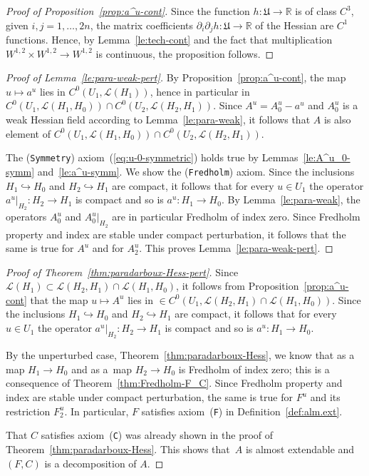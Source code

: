 \documentclass[pdftex]{sigma}
\numberwithin{equation}{section}
\newcommand{\R}{{\mathbb{R}}}
\newcommand{\Ll}{{\mathcal{L}}} %
\newcommand{\p}{{\partial}}
\newcommand{\INTO}{\hookrightarrow} %
\newcommand{\1}{{{\mathchoice {\rm 1\mskip-4mu l} {\rm 1\mskip-4mu l}
{\rm 1\mskip-4.5mu l} {\rm 1\mskip-5mu l}}}}
\begin{document}
\begin{proof}[Proof of Proposition~\ref{prop:a^u-cont}]
Since the function $h\colon\mathfrak{U}\to\R$ is of class $C^3$,
given $i,j=1,\dots,2n$, the matrix coefficients
$\p_i\p_j h\colon \mathfrak{U}\to\R$ of the Hessian are $C^1$ functions.
Hence, by Lemma~\ref{le:tech-cont}
and the fact that multiplication $W^{1,2}\times W^{1,2}\to W^{1,2}$ is
continuous, the proposition follows.
\end{proof}

\begin{proof}[Proof of Lemma~\ref{le:para-weak-pert}]
By Proposition~\ref{prop:a^u-cont},
the map $u\mapsto a^u$ lies in $C^0(U_1,\Ll(H_1))$,
hence in particular in
$C^0(U_1,\Ll(H_1,H_0)) \cap C^0(U_2,\Ll(H_2,H_1))$.
Since $A^u=A^u_0-a^u$ and $A^u_0$ is a weak Hessian field according to
Lemma~\ref{le:para-weak}, it follows that
$A$ is also element of $C^0(U_1,\Ll(H_1,H_0)) \cap C^0(U_2,\Ll(H_2,H_1))$.

The (\texttt{Symmetry}) axiom~(\ref{eq:u-0-symmetric}) holds true by
Lemmas~\ref{le:A^u_0-symm} and~\ref{le:a^u-symm}.
We show the (\texttt{Fredholm}) axiom.
Since the inclusions $H_1\INTO H_0$ and $H_2\INTO H_1$
are compact, it follows that for every $u\in U_1$
the operator $a^u|_{H_2}\colon H_2\to H_1$ is compact
and so is $a^u\colon H_1\to H_0$.
By Lemma~\ref{le:para-weak}, the operators $A^u_0$ and $A^u_0|_{H_2}$
are in particular Fredholm of index zero.
Since Fredholm property and index are stable under compact perturbation,
it follows that the same is true for $A^u$ and for $A^u_2$.
This proves Lemma~\ref{le:para-weak-pert}.
\end{proof}

\begin{proof}[Proof of Theorem~\ref{thm:paradarboux-Hess-pert}]
Since $\Ll(H_1)\subset \Ll(H_2,H_1)\cap\Ll(H_1,H_0)$,
it follows from Proposition~\ref{prop:a^u-cont}
that the map $u\mapsto A^u$ lies in
$\in C^0(U_1, \Ll(H_2,H_1)\cap\Ll(H_1,H_0))$.
Since the inclusions $H_1\INTO H_0$ and $H_2\INTO H_1$
are compact, it follows that for every $u\in U_1$
the operator $a^u|_{H_2}\colon H_2\to H_1$ is compact
and so is $a^u\colon H_1\to H_0$.

By the unperturbed case, Theorem~\ref{thm:paradarboux-Hess},
we know that \smash{$B_u^{-1}\p_t$} as a map $H_1\to H_0$ and as a~map $H_2\to
H_0$ is Fredholm of index zero;
this is a consequence of Theorem~\ref{thm:Fredholm-F_C}.
Since Fredholm property and index are stable under compact
perturbation, the same is true for $F^u$ and its restriction $F^u_2$.
In particular, $F$ satisfies axiom~(\texttt{F}) in Definition~\ref{def:alm.ext}.

That $C$ satisfies axiom~(\texttt{C}) was already shown in the proof
of Theorem~\ref{thm:paradarboux-Hess}.
This shows that~$A$ is almost extendable and $(F,C)$ is a
decomposition of $A$.
\end{proof}
\end{document}
